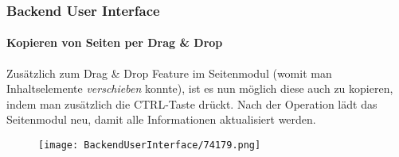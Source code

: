 \begin{frame}[fragile]
	\frametitle{Backend User Interface}
	\framesubtitle{Kopieren von Seiten per Drag \& Drop}

	Zusätzlich zum Drag \& Drop Feature im Seitenmodul (womit man Inhaltselemente \textit{verschieben} konnte), ist es nun möglich diese auch zu kopieren, indem man zusätzlich die CTRL-Taste drückt. Nach der Operation lädt das Seitenmodul neu, damit alle Informationen aktualisiert werden.

	\begin{figure}
		\texttt{[image: BackendUserInterface/74179.png]}
	\end{figure}

\end{frame}

